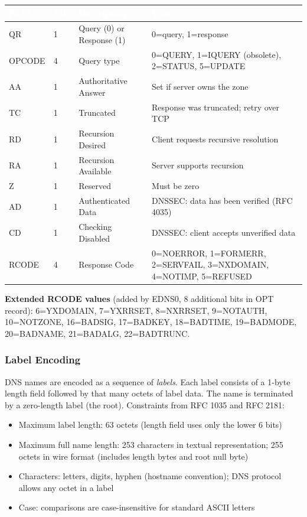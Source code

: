 \documentclass[11pt,letterpaper]{article}
\newcommand{\tableheader}[1]{\textbf{\sffamily\textcolor{white}{#1}}}
\begin{document}
\begin{center}
\begin{tabularx}{\textwidth}{C{1.8cm}C{1.2cm}XL{3.5cm}}
\toprule
{}
\tableheader{Field} & \tableheader{Bits} & \tableheader{Description} & \tableheader{Values} \\
\midrule
QR & 1 & Query (0) or Response (1) & 0=query, 1=response \\
OPCODE & 4 & Query type & 0=QUERY, 1=IQUERY (obsolete), 2=STATUS, 5=UPDATE \\
AA & 1 & Authoritative Answer & Set if server owns the zone \\
TC & 1 & Truncated & Response was truncated; retry over TCP \\
RD & 1 & Recursion Desired & Client requests recursive resolution \\
RA & 1 & Recursion Available & Server supports recursion \\
Z & 1 & Reserved & Must be zero \\
AD & 1 & Authenticated Data & DNSSEC: data has been verified (RFC 4035) \\
CD & 1 & Checking Disabled & DNSSEC: client accepts unverified data \\
RCODE & 4 & Response Code & 0=NOERROR, 1=FORMERR, 2=SERVFAIL, 3=NXDOMAIN, 4=NOTIMP, 5=REFUSED \\
\bottomrule
\end{tabularx}
\end{center}

\textbf{Extended RCODE values} (added by EDNS0, 8 additional bits in OPT record): 6=YXDOMAIN, 7=YXRRSET, 8=NXRRSET, 9=NOTAUTH, 10=NOTZONE, 16=BADSIG, 17=BADKEY, 18=BADTIME, 19=BADMODE, 20=BADNAME, 21=BADALG, 22=BADTRUNC.

\subsubsection{Label Encoding}

DNS names are encoded as a sequence of \emph{labels}. Each label consists of a 1-byte length field followed by that many octets of label data. The name is terminated by a zero-length label (the root). Constraints from RFC 1035 and RFC 2181:

\begin{itemize}
  \item Maximum label length: 63 octets (length field uses only the lower 6 bits)
  \item Maximum full name length: 253 characters in textual representation; 255 octets in wire format (includes length bytes and root null byte)
  \item Characters: letters, digits, hyphen (hostname convention); DNS protocol allows any octet in a label
  \item Case: comparisons are case-insensitive for standard ASCII letters
\end{itemize}
\end{document}
